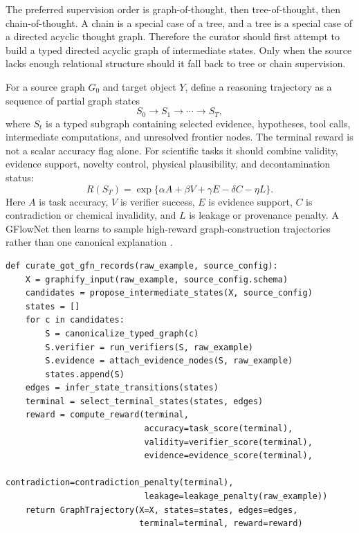 \documentclass[11pt]{article}
\newcommand{\1}{\mathbf{1}}
\begin{document}
The preferred supervision order is graph-of-thought, then tree-of-thought, then chain-of-thought. A chain is a special case of a tree, and a tree is a special case of a directed acyclic thought graph. Therefore the curator should first attempt to build a typed directed acyclic graph of intermediate states. Only when the source lacks enough relational structure should it fall back to tree or chain supervision.

For a source graph $G_0$ and target object $Y$, define a reasoning trajectory as a sequence of partial graph states
\[
S_0\to S_1\to\cdots\to S_T,
\]
where $S_t$ is a typed subgraph containing selected evidence, hypotheses, tool calls, intermediate computations, and unresolved frontier nodes. The terminal reward is not a scalar accuracy flag alone. For scientific tasks it should combine validity, evidence support, novelty control, physical plausibility, and decontamination status:
\[
R(S_T)=\exp\{\alpha A+\beta V+\gamma E-\delta C-\eta L\}.
\]
Here $A$ is task accuracy, $V$ is verifier success, $E$ is evidence support, $C$ is contradiction or chemical invalidity, and $L$ is leakage or provenance penalty. A GFlowNet then learns to sample high-reward graph-construction trajectories rather than one canonical explanation \cite{BengioGFlowFoundations2023,FlowOfReasoning2024,GFlowMath2025}.

\begin{lstlisting}[caption={Generic conversion of a source into graph-of-thought and GFlowNet records.}]
def curate_got_gfn_records(raw_example, source_config):
    X = graphify_input(raw_example, source_config.schema)
    candidates = propose_intermediate_states(X, source_config)
    states = []
    for c in candidates:
        S = canonicalize_typed_graph(c)
        S.verifier = run_verifiers(S, raw_example)
        S.evidence = attach_evidence_nodes(S, raw_example)
        states.append(S)
    edges = infer_state_transitions(states)
    terminal = select_terminal_states(states, edges)
    reward = compute_reward(terminal,
                            accuracy=task_score(terminal),
                            validity=verifier_score(terminal),
                            evidence=evidence_score(terminal),
                            contradiction=contradiction_penalty(terminal),
                            leakage=leakage_penalty(raw_example))
    return GraphTrajectory(X=X, states=states, edges=edges,
                           terminal=terminal, reward=reward)
\end{lstlisting}
\end{document}
